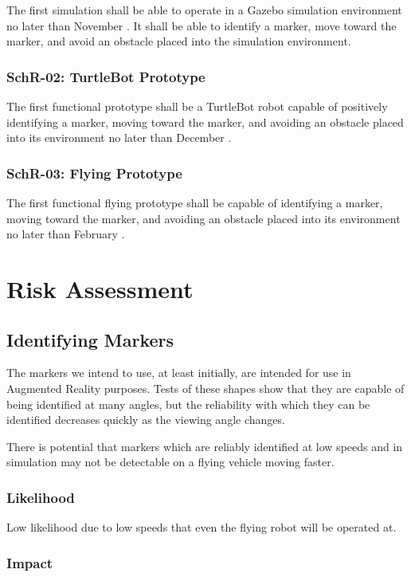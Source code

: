 \documentclass[]{report}
\begin{document}
The first simulation shall be able to operate in a Gazebo simulation environment no later than November . It shall be able to identify a marker, move toward the marker, and avoid an obstacle placed into the simulation environment.

\subsection{SchR-02: TurtleBot Prototype}

The first functional prototype shall be a TurtleBot robot capable of positively identifying a marker, moving toward the marker, and avoiding an obstacle placed into its environment no later than December .

\subsection{SchR-03: Flying Prototype}

The first functional flying prototype shall be capable of identifying a marker, moving toward the marker, and avoiding an obstacle placed into its environment no later than February  .

\chapter{Risk Assessment}

\section{Identifying Markers}

The markers we intend to use, at least initially, are intended for use in Augmented Reality purposes. Tests of these shapes show that they are capable of being identified at many angles, but the reliability with which they can be identified decreases quickly as the viewing angle changes. 

There is potential that markers which are reliably identified at low speeds and in simulation may not be detectable on a flying vehicle moving faster.

\subsection{Likelihood}

Low likelihood due to low speeds that even the flying robot will be operated at.

\subsection{Impact}
\end{document}
